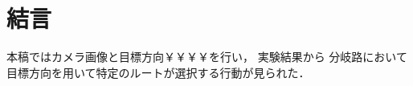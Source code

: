 \documentclass[10pt]{jarticle}
\begin{document}
    
    
    
        
    \section{結\hspace{2zw}言}%
    本稿ではカメラ画像と目標方向￥￥￥￥を行い，
    実験結果から
    分岐路において目標方向を用いて特定のルートが選択する行動が見られた．
    
\end{document}
